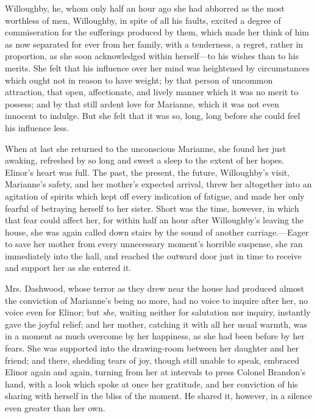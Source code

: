 Willoughby, he, whom only half an hour ago she had abhorred as the most worthless of men, Willoughby, in spite of all his faults, excited a degree of commiseration for the sufferings produced by them, which made her think of him as now separated for ever from her family, with a tenderness, a regret, rather in proportion, as she soon acknowledged within herself---to his wishes than to his merits. She felt that his influence over her mind was heightened by circumstances which ought not in reason to have weight; by that person of uncommon attraction, that open, affectionate, and lively manner which it was no merit to possess; and by that still ardent love for Marianne, which it was not even innocent to indulge. But she felt that it was so, long, long before she could feel his influence less.

When at last she returned to the unconscious Marianne, she found her just awaking, refreshed by so long and sweet a sleep to the extent of her hopes. Elinor's heart was full. The past, the present, the future, Willoughby's visit, Marianne's safety, and her mother's expected arrival, threw her altogether into an agitation of spirits which kept off every indication of fatigue, and made her only fearful of betraying herself to her sister. Short was the time, however, in which that fear could affect her, for within half an hour after Willoughby's leaving the house, she was again called down stairs by the sound of another carriage.---Eager to save her mother from every unnecessary moment's horrible suspense, she ran immediately into the hall, and reached the outward door just in time to receive and support her as she entered it.

Mrs. Dashwood, whose terror as they drew near the house had produced almost the conviction of Marianne's being no more, had no voice to inquire after her, no voice even for Elinor; but {\em she}, waiting neither for salutation nor inquiry, instantly gave the joyful relief; and her mother, catching it with all her usual warmth, was in a moment as much overcome by her happiness, as she had been before by her fears. She was supported into the drawing-room between her daughter and her friend; and there, shedding tears of joy, though still unable to speak, embraced Elinor again and again, turning from her at intervals to press Colonel Brandon's hand, with a look which spoke at once her gratitude, and her conviction of his sharing with herself in the bliss of the moment. He shared it, however, in a silence even greater than her own.

